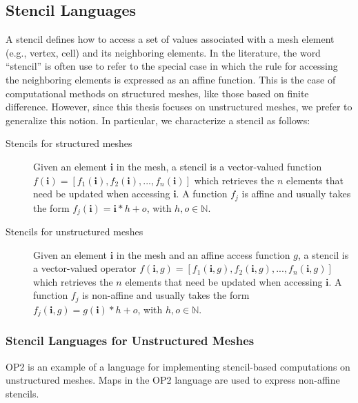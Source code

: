 \subsection{Stencil Languages}
\label{sec:bkg:stencil-lang}


A stencil defines how to access a set of values associated with a mesh element (e.g., vertex, cell) and its neighboring elements. In the literature, the word ``stencil'' is often use to refer to the special case in which the rule for accessing the neighboring elements is expressed as an affine function. This is the case of computational methods on structured meshes, like those based on finite difference. However, since this thesis focuses on unstructured meshes, we prefer to generalize this notion. In particular, we characterize a stencil as follows:

\begin{description}
\item[Stencils for structured meshes] Given an element $\boldsymbol{i}$ in the mesh, a stencil is a vector-valued function $f(\boldsymbol{i}) = [f_1(\boldsymbol{i}), f_2(\boldsymbol{i}), ..., f_n(\boldsymbol{i})]$ which retrieves the $n$ elements that need be updated when accessing $\boldsymbol{i}$. A function $f_j$ is affine and usually takes the form $f_j(\boldsymbol{i}) = \boldsymbol{i}*h + o$, with $h, o \in \mathbb{N}$.
\item[Stencils for unstructured meshes] Given an element $\boldsymbol{i}$ in the mesh and an affine access function $g$, a stencil is a vector-valued operator $f(\boldsymbol{i}, g) = [f_1(\boldsymbol{i}, g), f_2(\boldsymbol{i}, g), ..., f_n(\boldsymbol{i}, g)]$ which retrieves the $n$ elements that need be updated when accessing $\boldsymbol{i}$. A function $f_j$ is non-affine and usually takes the form $f_j(\boldsymbol{i}, g) = g(\boldsymbol{i})*h + o$, with $h, o \in \mathbb{N}$.
\end{description}

\subsubsection{Stencil Languages for Unstructured Meshes}
OP2 is an example of a language for implementing stencil-based computations on unstructured meshes. Maps in the OP2 language are used to express non-affine stencils. 

